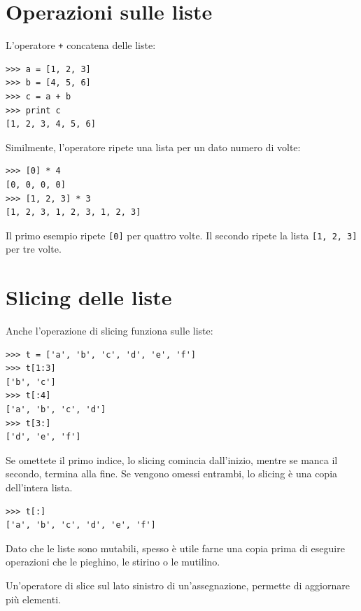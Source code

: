 \documentclass[10pt]{book}
\begin{document}
\section{Operazioni sulle liste}

L'operatore {\tt +} concatena delle liste:

\begin{verbatim}
>>> a = [1, 2, 3]
>>> b = [4, 5, 6]
>>> c = a + b
>>> print c
[1, 2, 3, 4, 5, 6]
\end{verbatim}
%
Similmente, l'operatore {\tt *} ripete una lista per un dato numero di volte:

\begin{verbatim}
>>> [0] * 4
[0, 0, 0, 0]
>>> [1, 2, 3] * 3
[1, 2, 3, 1, 2, 3, 1, 2, 3]
\end{verbatim}
%
Il primo esempio ripete {\tt [0]} per quattro volte. Il secondo ripete la lista {\tt [1, 2, 3]} per tre volte.


\section{Slicing delle liste}

Anche l'operazione di slicing funziona sulle liste:

\begin{verbatim}
>>> t = ['a', 'b', 'c', 'd', 'e', 'f']
>>> t[1:3]
['b', 'c']
>>> t[:4]
['a', 'b', 'c', 'd']
>>> t[3:]
['d', 'e', 'f']
\end{verbatim}
%
Se omettete il primo indice, lo slicing comincia dall'inizio, mentre se manca il secondo, termina alla fine. Se vengono omessi entrambi, lo slicing è una copia dell'intera lista.

\begin{verbatim}
>>> t[:]
['a', 'b', 'c', 'd', 'e', 'f']
\end{verbatim}
%
Dato che le liste sono mutabili, spesso è utile farne una copia prima di eseguire operazioni che le pieghino, le stirino o le mutilino.

Un'operatore di slice sul lato sinistro di un'assegnazione, permette di aggiornare più elementi.
\end{document}
